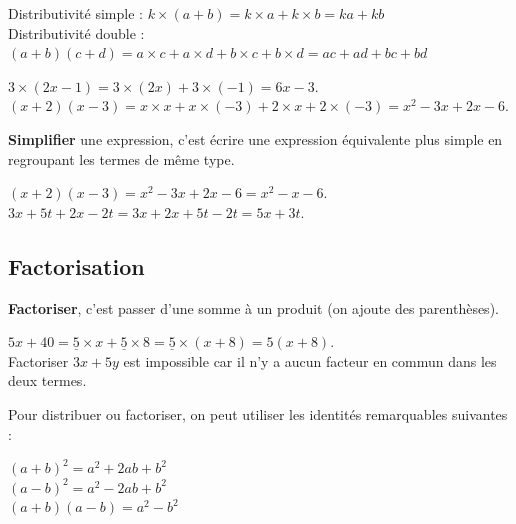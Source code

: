 \begin{propriete}[Distributivité]
   Distributivité simple : \qquad $k\times(a+b)=k\times a+k\times b =ka+kb$ \\
   Distributivité double : \qquad $(a+b)(c+d)=a\times c+a\times d+b\times c+b\times d =ac+ad+bc+bd$
\end{propriete}

\begin{exemple*1}
    $3\times(2x-1) =3\times(2x)+3\times(-1) =6x-3$. \\
    $(x+2)(x-3) =x\times x+x\times(-3)+2\times x+2\times(-3) =x^2-3x+2x-6$.
\end{exemple*1}

\begin{definition}[Simplifier]
   \textbf{Simplifier} une expression, c'est écrire une expression équivalente plus simple en regroupant les termes de même type.
\end{definition}
   
\begin{exemple*1}
   $(x+2)(x-3) =x^2-3x+2x-6 =x^2-x-6$. \\
   $3x+5t+2x-2t=3x+2x+5t-2t=5x+3t$.
\end{exemple*1}


\subsection{Factorisation} %

\begin{definition}[Factoriser]
   \textbf{Factoriser}, c'est passer d'une somme à un produit (on ajoute des parenthèses).
\end{definition}

\begin{exemple*1}
   $5x+40=\underline{5}\times x+\underline{5}\times8 =\underline{5}\times(x+8) =5(x+8)$. \\
   Factoriser $3x+5y$ est impossible car il n'y a aucun facteur en commun dans les deux termes.
\end{exemple*1}

\begin{propriete}
   Pour distribuer ou factoriser, on peut utiliser les identités remarquables suivantes : \vspace*{-2mm}
   \begin{center}
      $(a+b)^2 =a^2+2ab+b^2$ \\
      $(a-b)^2 =a^2-2ab+b^2$ \\
      $(a+b)(a-b) =a^2-b^2$
   \end{center}
\end{propriete}

